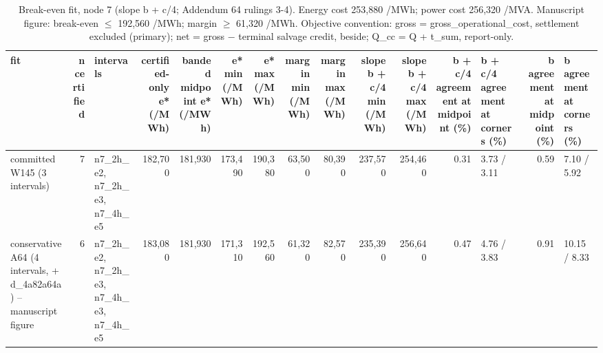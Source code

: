 \begin{table}[htbp]
\centering
\scriptsize
\caption{Break-even fit, node 7 (slope b + c/4; Addendum 64 rulings 3-4). Energy cost 253,880 \texteuro{}/MWh; power cost 256,320 \texteuro{}/MVA. Manuscript figure: break-even $\leq$ 192,560 \texteuro{}/MWh; margin $\geq$ 61,320 \texteuro{}/MWh. Objective convention: gross = gross\_operational\_cost, settlement excluded (primary); net = gross $-$ terminal salvage credit, beside; Q\_cc = Q + t\_sum, report-only.}
\label{tab:T3}
\begin{tabular}{lrlrrrrrrrrrlrl}
\toprule
fit & n certified & intervals & certified-only e* (\texteuro{}/MWh) & banded midpoint e* (\texteuro{}/MWh) & e* min (\texteuro{}/MWh) & e* max (\texteuro{}/MWh) & margin min (\texteuro{}/MWh) & margin max (\texteuro{}/MWh) & slope b + c/4 min (\texteuro{}/MWh) & slope b + c/4 max (\texteuro{}/MWh) & b + c/4 agreement at midpoint (\%) & b + c/4 agreement at corners (\%) & b agreement at midpoint (\%) & b agreement at corners (\%) \\
\midrule
committed W145 (3 intervals) & 7 & n7\_2h\_e2, n7\_2h\_e3, n7\_4h\_e5 & 182,700 & 181,930 & 173,490 & 190,380 & 63,500 & 80,390 & 237,570 & 254,460 & 0.31 & 3.73 / 3.11 & 0.59 & 7.10 / 5.92 \\
conservative A64 (4 intervals, + d\_4a82a64a) -- manuscript figure & 6 & n7\_2h\_e2, n7\_2h\_e3, n7\_4h\_e3, n7\_4h\_e5 & 183,080 & 181,930 & 171,310 & 192,560 & 61,320 & 82,570 & 235,390 & 256,640 & 0.47 & 4.76 / 3.83 & 0.91 & 10.15 / 8.33 \\
\bottomrule
\end{tabular}
\end{table}
